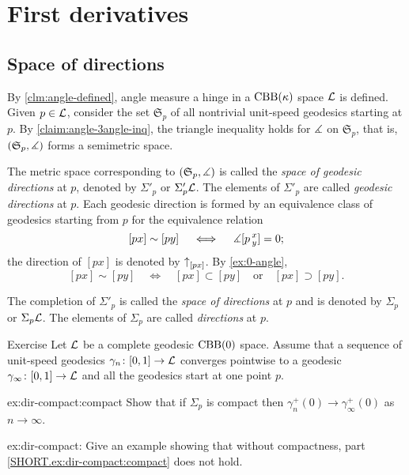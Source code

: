 \chapter{First derivatives}

\section{Space of directions} 
\label{sec:space+directions}

By \ref{clm:angle-defined}, angle measure a hinge in a $\mathrm{CBB}(\kappa)$ space $\mathcal{L}$ is defined.
Given $p\in \mathcal{L}$, consider the set $\mathfrak{S}_p$ of all nontrivial unit-speed geodesics starting at $p$.
By \ref{claim:angle-3angle-inq}, the triangle inequality holds for $\measuredangle$ on $\mathfrak{S}_p$,
that is, $(\mathfrak{S}_p,\measuredangle)$ 
forms a semimetric space.

The metric space corresponding to  $(\mathfrak{S}_p,\measuredangle)$ is called the \emph{space of geodesic directions} at $p$, denoted by $\Sigma'_p$ or $\Sigma'_p\mathcal{L}$.
The elements of $\Sigma'_p$ are called \emph{geodesic directions} at $p$.
Each geodesic direction is formed by an equivalence class of geodesics starting from $p$ 
for the equivalence relation 
\[[px]\sim[py]\quad \iff\quad \measuredangle[p\,{}^{x}_{y}]=0;\]
the direction of $[px]$ is denoted by ${\uparrow}_{[{p}{x}]} $.
By \ref{ex:0-angle}, 
\[[px]\sim[py]
\quad\iff\quad
[px]\subset [py]
\quad\text{or}\quad
[px]\supset[py].
\]
 
The completion of $\Sigma'_p$ is called the \emph{space of directions} at $p$ and is denoted by $\Sigma_p$ or $\Sigma_p\mathcal{L}$.
The elements of $\Sigma_p$ are called \emph{directions} at $p$.

\begin{thm}{Exercise}\label{ex:dir-compact}
Let $\mathcal{L}$ be a complete geodesic $\mathrm{CBB}(0)$ space.
Assume that a sequence of unit-speed geodesics $\gamma_n\colon[0,1]\to \mathcal{L}$ converges pointwise to a geodesic $\gamma_\infty\colon[0,1]\to \mathcal{L}$ and all the geodesics start at one point $p$.

\begin{subthm}{ex:dir-compact:compact}
Show that if $\Sigma_p$ is compact then $\gamma_n^+(0)\to \gamma_\infty^+(0)$ as $n\to\infty$.
\end{subthm}

\begin{subthm}{ex:dir-compact:}
Give an example showing that without compactness, part \ref{SHORT.ex:dir-compact:compact} does not hold.
\end{subthm}

\end{thm}


